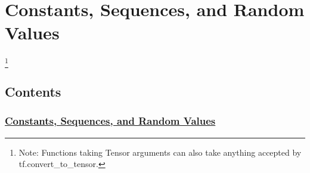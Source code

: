 
\section{Constants, Sequences, and Random Values} \label{const_seq_rnd}

\footnote{Note: Functions taking Tensor arguments can also take anything accepted by tf.convert_to_tensor.}

\subsection{Contents}\label{contents}

\subsubsection{\texorpdfstring{\protect\hyperlink{AUTOGENERATED-constants--sequences--and-random-values}{Constants,
Sequences, and Random
Values}}{Constants, Sequences, and Random Values}}\label{constants-sequences-and-random-values-1}

